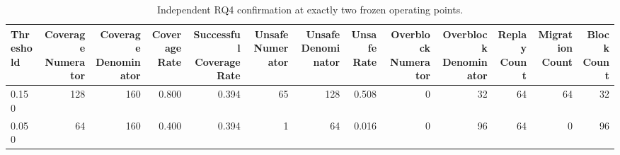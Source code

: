 \begin{table}[t]
\centering
\small
\begin{tabular}{lrrrrrrrrrrrr}
\toprule
Threshold & Coverage Numerator & Coverage Denominator & Coverage Rate & Successful Coverage Rate & Unsafe Numerator & Unsafe Denominator & Unsafe Rate & Overblock Numerator & Overblock Denominator & Replay Count & Migration Count & Block Count \\
\midrule
0.150 & 128 & 160 & 0.800 & 0.394 & 65 & 128 & 0.508 & 0 & 32 & 64 & 64 & 32 \\
0.050 & 64 & 160 & 0.400 & 0.394 & 1 & 64 & 0.016 & 0 & 96 & 64 & 0 & 96 \\
\bottomrule
\end{tabular}
\caption{Independent RQ4 confirmation at exactly two frozen operating points.}
\label{tab:rq4_fresh_operating_points}
\end{table}
